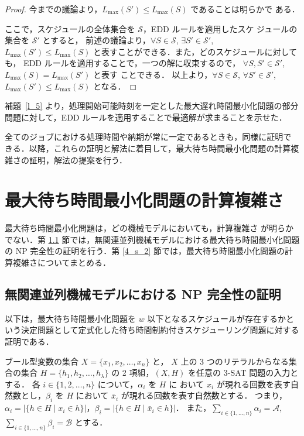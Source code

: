 \documentclass[12pt]{optlab-bachelor}
\begin{document}
\begin{proof}
  今までの議論より，$L_{\max}(S') \le L_{\max}(S)$ であることは明らかで
  ある．

  ここで，スケジュールの全体集合を $\mathcal{S}$，EDD ルールを適用したスケ
  ジュールの集合を $\mathcal{S}'$ とすると，
  前述の議論より，$\forall S \in \mathcal{S}$, $\exists S' \in \mathcal{S}'$, $L_{\max}(S') \le L_{\max}(S)$ と表すことができる．また，どのスケジュールに対しても，
  EDD ルールを適用することで，一つの解に収束するので，
  $\forall S, S' \in \mathcal{S}'$, $L_{\max}(S) = L_{\max}(S')$ と表す
  ことできる．
  以上より，$\forall S \in \mathcal{S}$, $\forall
  S' \in \mathcal{S}'$, $L_{\max}(S') \le L_{\max}(S)$ となる．
\end{proof}

補題~\ref{l_5} より，処理開始可能時刻を一定とした最大遅れ時間最小化問題の部分問題に対して，EDD ルールを適用することで最適解が求まることを示せた．

全てのジョブにおける処理時間や納期が常に一定であるときも，同様に証明で
きる．以降，これらの証明と解法に着目して，最大待ち時間最小化問題の計算複雑さの証明，解法の提案を行う．

\chapter{最大待ち時間最小化問題の計算複雑さ}\label{c_4}
最大待ち時間最小化問題は，どの機械モデルにおいても，計算複雑さ
が明らかでない．第 \ref{4_s_1} 節では，無関連並列機械モデルにおける最大待ち時間最小化問題の NP 完全性の証明を行う．第 \ref{4_s_2} 節では，最大待ち時間最小化問題の計算複雑さについてまとめる．

\section{無関連並列機械モデルにおける NP 完全性の証明}\label{4_s_1}
以下は，最大待ち時間最小化問題を $w$ 以下となるスケジュールが存在するかという決定問題として定式化した待ち時間制約付きスケジューリング問題に対する証明である．

ブール型変数の集合 $X =\{x_1, x_2,\ldots ,x_n\}$ と， $X$ 上の 3 つのリテラルからなる集合の集合 $H =\{h_1, h_2,\ldots ,h_{\lambda}\}$ の 2 項組，$(X,H)$ を任意の \textsc{3-SAT} 問題の入力とする．
各 $i \in \{1,2,\ldots, n\}$ について，$\alpha_i$ を $H$ に おいて $x_i$ が現れる回数を表す自然数とし，$\beta_i$ を $H$ において $\bar x_i$ が現れる回数を表す自然数とする．
つまり，$\alpha_i = \big|\{h \in H \mid x_i \in h\}\big|$，$\beta_i = \big|\{h \in H \mid \bar x_i \in h\}\big|$．
また，$\displaystyle \sum_{i \in \{1,\ldots,n\}} \alpha_i = \mathcal{A}$, $\displaystyle \sum_{i \in \{1,\ldots,n\}} \beta_i = \mathcal{B}$  とする．
\end{document}
